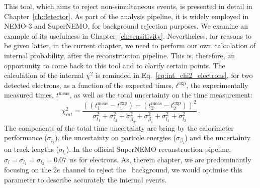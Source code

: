 This tool, which aims to reject non-simultaneous events, is presented in detail in Chapter~\ref{ch:detector}.
As part of the analysis pipeline, it is widely employed in NEMO-$3$ and SuperNEMO, for background rejection purposes.
We examine an example of its usefulness in Chapter~\ref{ch:sensitivity}.
Nevertheless, for reasons to be given latter, in the current chapter, we need to perform our own calculation of internal probability, after the reconstruction pipeline.
This is, therefore, an opportunity to come back to this tool and to clarify certain points.
The calculation of the internal $\chi^{2}$ is reminded in Eq.~\eqref{eq:int_chi2_electrons}, for two detected electrons, as a function of the expected times, $t^{\text{exp}}$, the experimentally measured times, $t^{\text{meas}}$, as well as the total uncertainty on the time measurement:
\begin{equation}
  \chi^{2}_{int}=\frac{((t^{\text{meas}}_{1} - t^{\text{exp}}_{1}) - (t^{\text{meas}}_{2} - t^{\text{exp}}_{2}))^{2}}{\sigma_{t_{1}}^{2}+\sigma_{t_{2}}^{2}+\sigma_{\beta_{2}}^{2}+\sigma_{\beta_{1}}^{2}+\sigma_{l_{1}}^{2}+\sigma_{l_{2}}^{2}}\,.
  \label{eq:int_chi2_electrons}
\end{equation}
The compenents of the total time uncertainty are bring by the calorimeter performance ($\sigma_{t_{i}}$), the uncertainty on particle energies ($\sigma_{\beta_{i}}$) and the uncertainty on track lengths ($\sigma_{l_{i}}$).
In the official SuperNEMO reconstruction pipeline, ${\sigma_{l}=\sigma_{l_{1}}=\sigma_{l_{2}}=0.07}$~ns for electrons.
As, therein chapter, we are predominantly focusing on the $2e$ channel to reject the \Tl\ background, we would optimise this parameter to describe accurately the internal events.

